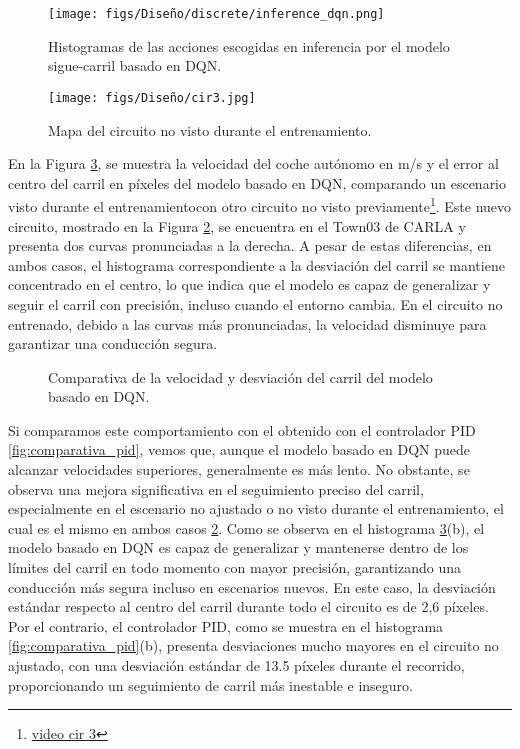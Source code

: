 \begin{figure}[ht]
\centering
\texttt{[image: figs/Diseño/discrete/inference\_dqn.png]}
\caption{Histogramas de las acciones escogidas en inferencia por el modelo sigue-carril basado en \ac{DQN}.}
\label{fig:inference_dqn}
\end{figure}

\begin{figure}[ht]
\centering
\texttt{[image: figs/Diseño/cir3.jpg]}
\caption{Mapa del circuito no visto durante el entrenamiento.}
\label{fig:cir3}
\end{figure}

En la Figura \ref{fig:comparativa_dqn}, se muestra la velocidad del coche autónomo en m/s y el error al centro del carril en píxeles del modelo basado en \ac{DQN}, comparando un escenario visto durante el entrenamiento\footnotemark[3] con otro circuito no visto previamente\footnote{\url{video cir 3}}. Este nuevo circuito, mostrado en la Figura \ref{fig:cir3}, se encuentra en el Town03 de CARLA y presenta dos curvas pronunciadas a la derecha. A pesar de estas diferencias, en ambos casos, el histograma correspondiente a la desviación del carril se mantiene concentrado en el centro, lo que indica que el modelo es capaz de generalizar y seguir el carril con precisión, incluso cuando el entorno cambia. En el circuito no entrenado, debido a las curvas más pronunciadas, la velocidad disminuye para garantizar una conducción segura.

\begin{figure}[ht]
\centering
{}
\hfill
{}
\caption{Comparativa de la velocidad y desviación del carril del modelo basado en \ac{DQN}.}
\label{fig:comparativa_dqn}
\end{figure}
\newpage

Si comparamos este comportamiento con el obtenido con el controlador \ac{PID} \ref{fig:comparativa_pid}, vemos que, aunque el modelo basado en \ac{DQN} puede alcanzar velocidades superiores, generalmente es más lento. No obstante, se observa una mejora significativa en el seguimiento preciso del carril, especialmente en el escenario no ajustado o no visto durante el entrenamiento, el cual es el mismo en ambos casos \ref{fig:cir3}. Como se observa en el histograma \ref{fig:comparativa_dqn}(b), el modelo basado en \ac{DQN} es capaz de generalizar y mantenerse dentro de los límites del carril en todo momento con mayor precisión, garantizando una conducción más segura incluso en escenarios nuevos. En este caso, la desviación estándar respecto al centro del carril durante todo el circuito es de 2,6 píxeles. Por el contrario, el controlador \ac{PID}, como se muestra en el histograma \ref{fig:comparativa_pid}(b), presenta desviaciones mucho mayores en el circuito no ajustado, con una desviación estándar de 13.5 píxeles durante el recorrido, proporcionando un seguimiento de carril más inestable e inseguro.

